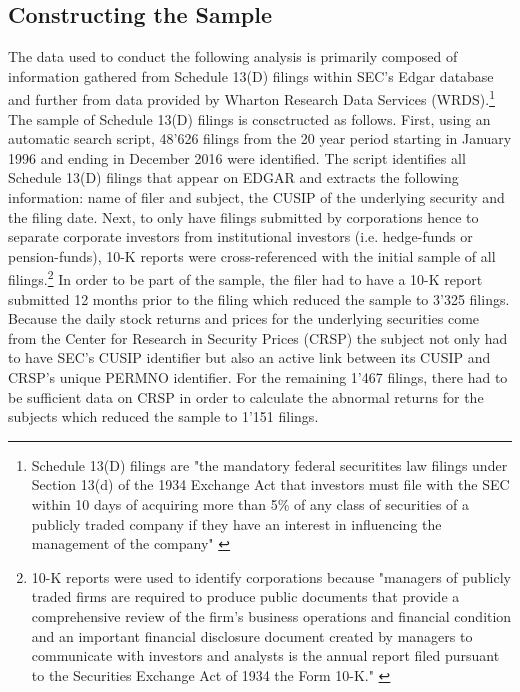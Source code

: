 \documentclass[12pt]{article}
\begin{document}
\subsection{Constructing the Sample}
The data used to conduct the following analysis is primarily composed of information gathered from Schedule 13(D) filings within SEC's Edgar database and further from data provided by Wharton Research Data Services (WRDS).\footnote{Schedule 13(D) filings are "the mandatory federal securitites law filings under Section 13(d) of the 1934 Exchange Act that investors must file with the SEC within 10 days of acquiring more than 5\% of any class of securities of a publicly traded company if they have an interest in influencing the management of the company" \citep[p. 1736]{Brav2008}} The sample of Schedule 13(D) filings is consctructed as follows. First, using an automatic search script, 48'626 filings from the 20 year period starting in January 1996 and ending in December 2016 were identified.  The script identifies all Schedule 13(D) filings that appear on EDGAR and extracts the following information: name of filer and subject, the CUSIP of the underlying security and the filing date. Next, to only have filings submitted by corporations hence to separate corporate investors from institutional investors (i.e. hedge-funds or pension-funds), 10-K reports were cross-referenced with the initial sample of all filings.\footnote{10-K reports were used to identify corporations because "managers of publicly traded firms are required to produce public documents that provide a comprehensive review of the firm’s business operations and financial condition and an important financial disclosure document created by managers to communicate with investors and analysts is the annual report filed pursuant to the Securities Exchange Act of 1934 the Form 10-K." \citep[p. 1643]{Loughran2014}} In order to be part of the sample, the filer had to have a 10-K report submitted 12 months prior to the filing which reduced the sample to 3'325 filings. Because the daily stock returns and prices for the underlying securities come from the Center for Research in Security Prices (CRSP) the subject not only had to have SEC's CUSIP identifier but also an active link between its CUSIP and CRSP's unique PERMNO identifier. For the remaining 1'467 filings, there had to be sufficient data on CRSP in order to calculate the abnormal returns for the subjects which reduced the sample to 1'151 filings. 
\end{document}

